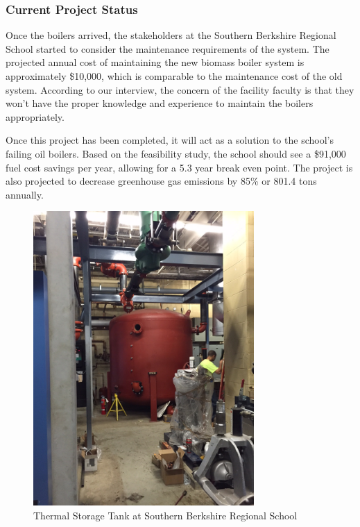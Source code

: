 \subsubsection{Current Project Status}
\par Once the boilers arrived, the stakeholders at the Southern Berkshire Regional School started to consider the maintenance requirements of the system. The projected annual cost of maintaining the new biomass boiler system is approximately \$10,000, which is comparable to the maintenance cost of the old system. According to our interview, the concern of the facility faculty is that they won’t have the proper knowledge and experience to maintain the boilers appropriately.
\par Once this project has been completed, it will act as a solution to the school’s failing oil boilers. Based on the feasibility study, the school should see a \$91,000 fuel cost savings per year, allowing for a 5.3 year break even point. The project is also projected to decrease greenhouse gas emissions by 85\% or 801.4 tons annually.
\begin{figure}[H]
\centering
\includegraphics[width=0.75\textwidth, angle=-90]{findingschapter/southernberkshirethermalstorage}
\caption{Thermal Storage Tank at Southern Berkshire Regional School}
\label{fig:sbrstank}
\end{figure}

